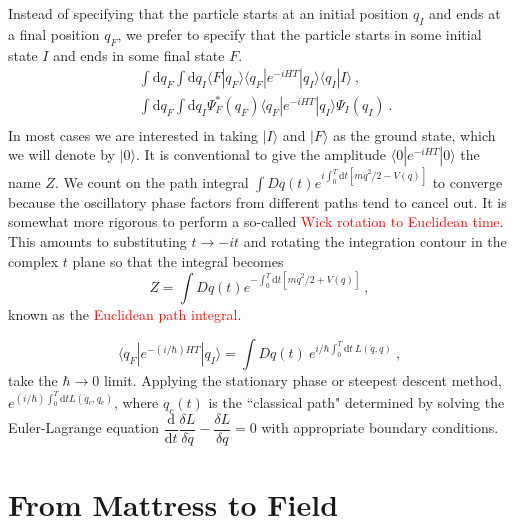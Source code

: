 \documentclass[11pt,a4paper]{article}
\newcommand{\dif}{\mathrm{d}}
\begin{document}
Instead of specifying that the particle starts at an initial position $q_I$ and ends at a final position $q_F$, we prefer to specify that the particle starts in some initial state $I$ and ends in some final state $F$.
\begin{align*}
& \int \dif q_F \int \dif q_I  \langle F | q_F \rangle \langle q_F| e^{-iHT}| q_I\rangle \langle q_I| I \rangle ~, \\
& \int \dif q_F \int \dif q_I \Psi^\ast_F(q_F) \langle q_F| e^{-iHT}| q_I\rangle \Psi_I(q_I) ~. \\
\end{align*}
In most cases we are interested in taking $|I\rangle$ and $|F\rangle$ as the ground state, which we will denote by $|0\rangle$. It is conventional to give the amplitude $ \langle 0| e^{-iHT}| 0\rangle$ the name $Z$. We count on the path integral $\int Dq(t) e^{i \int_0^T \dif t [m\dot{q}^2/2 -V(q)]}$ to converge because the oscillatory phase factors from different paths tend to cancel out. It is somewhat more rigorous to perform a so-called \textcolor{red}{Wick rotation to Euclidean time}. This amounts to substituting $t \rightarrow -it$ and rotating the integration contour in the complex $t$ plane so that the integral becomes
\begin{equation}
Z = \int Dq(t) e^{-\int_0^T \dif t [m\dot{q}^2/2 +V(q)]} ~,
\end{equation}
known as the \textcolor{red}{Euclidean path integral}. 

\begin{equation*}
\langle q_F |e^{-(i/\hbar)HT}| q_I\rangle = \int Dq(t) ~e^{i/\hbar \int_0^T \dif t ~L(\dot{q}, q)} ~,
\end{equation*}
take the $\hbar \rightarrow 0$ limit. Applying the stationary phase or steepest descent method, $e^{(i/\hbar)\int_0^T \dif t L(\dot{q}_c, q_c)}$, where $q_c(t)$ is the ``classical path" determined by solving the Euler-Lagrange equation $\dfrac{\dif}{\dif t} \dfrac{\delta L}{\delta \dot{q}} - \dfrac{\delta L}{\delta q} = 0$ with appropriate boundary conditions.






\section{From Mattress to Field}











































\end{document}
